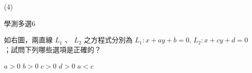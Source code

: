 \begin{QUESTIONS}
\begin{QUESTION}
        \begin{QFROMS}
        \end{QFROMS}
        \begin{QTAGS}\end{QTAGS}
        \begin{QANS}
            (4)
        \end{QANS}
        \begin{QSOLLIST}
        \end{QSOLLIST}
        \begin{QEMPTYSPACE}
        \end{QEMPTYSPACE}
    \end{QUESTION}
\end{QUESTIONS}
\begin{QUESTIONS}
    \begin{QUESTION}
        \begin{ExamInfo}{92}{學測}{多選}{6}
        \end{ExamInfo}
        \begin{ExamAnsRateInfo}{41}{71}{40}{12}
        \end{ExamAnsRateInfo}
        \begin{QBODY}
            如右圖，兩直線 $L_1$ 、 $L_2$ 之方程式分別為 $L_1 : x+ay+b=0$, $L_2 :x+cy+d=0$；試問下列哪些選項是正確的？ 
            \begin{QOPS} 
                \QOP $a>0$ 
                \QOP $b>0$ 
                \QOP $c>0$ 
                \QOP $d>0$ 
                \QOP $a<c$ 
            \end{QOPS}
            

\end{QBODY}
\end{QUESTION}
\end{QUESTIONS}

